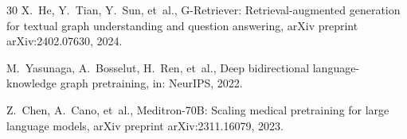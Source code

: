 \documentclass[preprint,12pt]{elsarticle}
\begin{document}
\begin{thebibliography}{30}
X.~He, Y.~Tian, Y.~Sun, et~al., G-Retriever: Retrieval-augmented generation for textual graph understanding and question answering, arXiv preprint arXiv:2402.07630, 2024.

M.~Yasunaga, A.~Bosselut, H.~Ren, et~al., Deep bidirectional language-knowledge graph pretraining, in: NeurIPS, 2022.

Z.~Chen, A.~Cano, et~al., Meditron-70B: Scaling medical pretraining for large language models, arXiv preprint arXiv:2311.16079, 2023.

\end{thebibliography}
\end{document}
